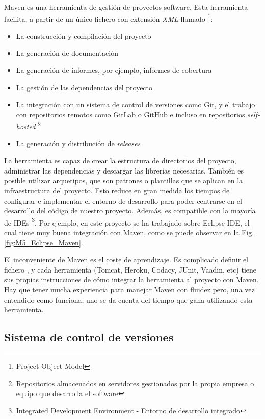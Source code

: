 Maven es una herramienta de gestión de proyectos software. Esta herramienta facilita, a partir de un único fichero con extensión \textit{XML} llamado  \footnote{Project Object Model}:
\begin{itemize}
	\tightlist
	\item La construcción y compilación del proyecto
	\item La generación de documentación
	\item La generación de informes, por ejemplo, informes de cobertura
	\item La gestión de las dependencias del proyecto
	\item La integración con un sistema de control de versiones como Git, y el trabajo con repositorios remotos como GitLab o GitHub e incluso en repositorios \textit{self-hosted} \footnote{Repositorios almacenados en servidores gestionados por la propia empresa o equipo que desarrolla el software}
	\item La generación y distribución de \textit{releases}
\end{itemize}
La herramienta es capaz de crear la estructura de directorios del proyecto, administrar las dependencias y descargar las librerías necesarias. También es posible utilizar arquetipos, que son patrones o plantillas que se aplican en la infraestructura del proyecto. Esto reduce en gran medida los tiempos de configurar e implementar el entorno de desarrollo para poder centrarse en el desarrollo del código de nuestro proyecto. Además, es compatible con la mayoría de IDEs \footnote{Integrated Development Environment - Entorno de desarrollo integrado}. Por ejemplo, en este proyecto se ha trabajado sobre Eclipse IDE, el cual tiene muy buena integración con Maven, como se puede observar en la Fig. \ref{fig:M5_Eclipse_Maven}.


El inconveniente de Maven es el coste de aprendizaje. Es complicado definir el fichero , y cada herramienta (Tomcat, Heroku, Codacy, JUnit, Vaadin, etc) tiene sus propias instrucciones de cómo integrar la herramienta al proyecto con Maven. Hay que tener mucha experiencia para manejar Maven con fluidez pero, una vez entendido como funciona, uno se da cuenta del tiempo que gana utilizando esta herramienta.

\subsection{Sistema de control de versiones}

